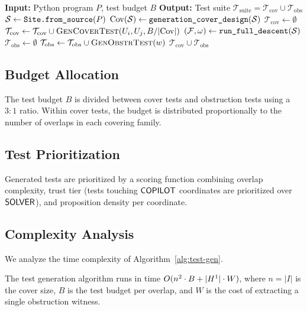 \documentclass[11pt]{article}
\newcommand{\GenCoverDesign}{\texttt{generation\_cover\_design}}
\newcommand{\RunDescent}{\texttt{run\_full\_descent}}
\newcommand{\TestSuite}{\mathcal{T}_{\mathrm{suite}}}
\newcommand{\CoverSuite}{\mathcal{T}_{\mathrm{cov}}}
\newcommand{\ObstrSuite}{\mathcal{T}_{\mathrm{obs}}}
\begin{document}
\begin{algorithm}[H]
\caption{Test Suite Generation from Covers and Obstructions}
\label{alg:test-gen}
\begin{algorithmic}[1]
\STATE \textbf{Input:} Python program $P$, test budget $B$
\STATE \textbf{Output:} Test suite $\TestSuite = \CoverSuite \cup \ObstrSuite$
\STATE $\mathcal{S} \gets \texttt{Site.from\_source}(P)$
\STATE $\Cov(\Site) \gets \GenCoverDesign(\Site)$
\STATE $\CoverSuite \gets \emptyset$
    \STATE $\CoverSuite \gets \CoverSuite \cup
           \textsc{GenCoverTest}(U_i, U_j, B / |\Cov|)$
  \ENDFOR
\ENDFOR
\STATE $(\mathcal{F}, \omega) \gets \RunDescent(\Site)$
\STATE $\ObstrSuite \gets \emptyset$
    \STATE $\ObstrSuite \gets \ObstrSuite \cup
           \textsc{GenObstrTest}(w)$
  \ENDFOR
\ENDIF
\RETURN $\CoverSuite \cup \ObstrSuite$
\end{algorithmic}
\end{algorithm}

\subsection{Budget Allocation}
The test budget $B$ is divided between cover tests and obstruction tests
using a $3{:}1$ ratio.  Within cover tests, the budget is distributed
proportionally to the number of overlaps in each covering family.

\subsection{Test Prioritization}
Generated tests are prioritized by a scoring function combining overlap
complexity, trust tier (tests touching $\mathsf{COPILOT}$ coordinates are
prioritized over $\mathsf{SOLVER}$), and proposition density per coordinate.

\subsection{Complexity Analysis}\label{sec:complexity}

We analyze the time complexity of Algorithm~\ref{alg:test-gen}.

\begin{theorem}\label{thm:complexity}
The test generation algorithm runs in time
$O(n^2 \cdot B + |H^{1}| \cdot W)$,
where $n = |I|$ is the cover size, $B$ is the test budget per overlap,
and $W$ is the cost of extracting a single obstruction witness.
\end{theorem}
\end{document}
